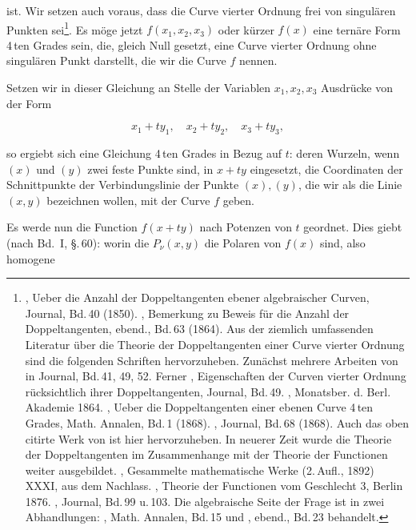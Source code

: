 ist. Wir setzen auch voraus, dass die Curve vierter Ordnung frei von singulären Punkten sei\footnote{, \glqq Ueber die Anzahl der Doppeltangenten ebener algebraischer Curven\grqq{},  Journal, Bd.\,40 (1850). , \glqq Bemerkung zu  Beweis für die Anzahl der Doppeltangenten\grqq{}, ebend., Bd.\,63 (1864). Aus der ziemlich umfassenden Literatur über die Theorie der Doppeltangenten einer Curve vierter Ordnung sind die folgenden Schriften hervorzuheben. Zunächst mehrere Arbeiten von  in  Journal, Bd.\,41, 49, 52. Ferner , Eigenschaften der Curven vierter Ordnung rücksichtlich ihrer Doppeltangenten,  Journal, Bd.\,49. , Monatsber. d. Berl. Akademie 1864. , \glqq Ueber die Doppeltangenten einer ebenen Curve 4\,ten Grades\grqq{}, Math. Annalen, Bd.\,1 (1868). ,  Journal, Bd.\,68 (1868). Auch das oben citirte Werk von  ist hier hervorzuheben. In neuerer Zeit wurde die Theorie der Doppeltangenten im Zusammenhange mit der Theorie der  Functionen weiter ausgebildet. , Gesammelte mathematische Werke (2.\,Aufl., 1892) XXXI, aus dem Nachlass. , Theorie der  Functionen vom Geschlecht 3, Berlin 1876. ,  Journal, Bd.\,99 u.\,103. Die algebraische Seite der Frage ist in zwei Abhandlungen: , Math. Annalen, Bd.\,15 und , ebend., Bd.\,23 behandelt.}. Es möge jetzt $f(x_1, x_2, x_3)$ oder kürzer $f(x)$ eine ternäre Form 4\,ten Grades sein, die, gleich Null gesetzt, eine Curve vierter Ordnung ohne singulären Punkt darstellt, die wir die Curve $f$ nennen.

Setzen wir in dieser Gleichung
an Stelle der Variablen $x_1, x_2, x_3$ Ausdrücke von der Form

\[
x_1+t y_1, \quad x_2+t y_2, \quad x_3+t y_3,
\]

so ergiebt sich eine Gleichung 4\,ten Grades in Bezug auf $t$:
deren Wurzeln, wenn $(x)$ und $(y)$ zwei feste Punkte sind, in $x+ty$ eingesetzt, die Coordinaten der Schnittpunkte der Verbindungslinie der Punkte $(x), (y)$, die wir als die Linie $(x,y)$ bezeichnen wollen, mit der Curve $f$ geben.

Es werde nun die Function $f(x+ty)$ nach Potenzen von $t$ geordnet. Dies giebt (nach Bd.\ I, \S.\,60):
worin die $P_\nu(x,y)$ die Polaren von $f(x)$ sind, also homogene
